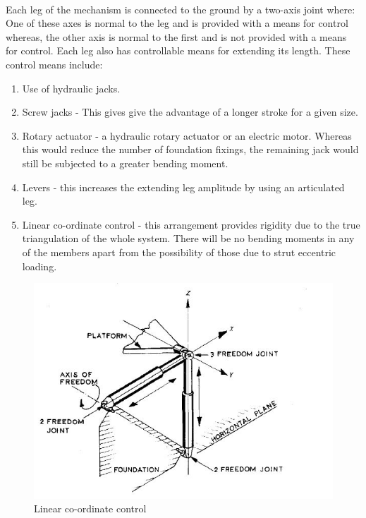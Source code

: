 \paragraph{}Each leg of the mechanism is connected to the ground by a two-axis joint where: One of these axes is
normal to the leg and is provided with a means for control whereas, the other axis is normal to the first and is not provided with a means for control.
Each leg also has controllable means for extending its length. These control means include:
\begin{enumerate}
\item Use of hydraulic jacks.
\item Screw jacks - This gives give the advantage of
a longer stroke for a given size.
\item Rotary actuator - a hydraulic rotary actuator or an electric motor. Whereas this would reduce the number of foundation fixings, the remaining jack would still be subjected to a greater bending moment.
\item Levers - this increases the extending leg amplitude by using an articulated leg.
\item Linear co-ordinate control - this arrangement provides rigidity due to the true triangulation of
the whole system. There will be no bending moments in any of the members apart from the possibility of those due to strut eccentric loading. 
\end{enumerate}
\begin{center}
	\begin{figure}[!h]
	\centering
	\includegraphics{Figures/Fig11}
	\caption{Linear co-ordinate control}
	\end{figure}
\end{center}
